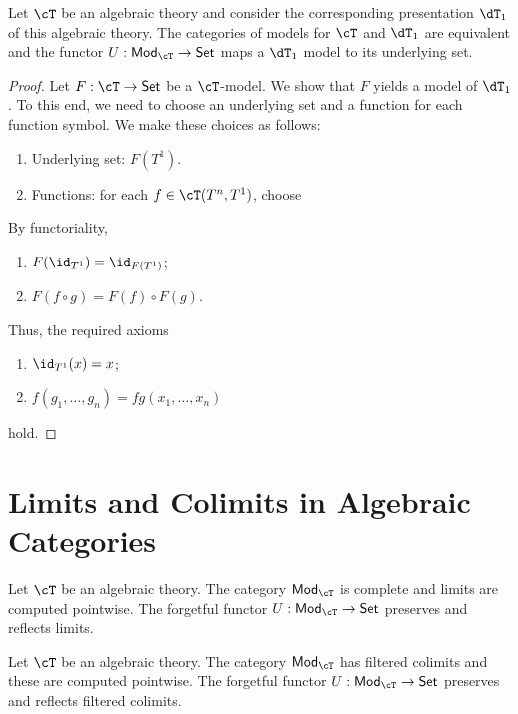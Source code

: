 \documentclass{amsart}
\begin{document}
\begin{lem}
  Let $\cT$ be an algebraic theory and consider the corresponding presentation $\dT_{1}$ of this algebraic theory.
  The categories of models for $\cT$ and $\dT_{1}$ are equivalent and the functor $U : \mathsf{Mod}_{\cT} \to \mathsf{Set}$ maps a $\dT_{1}$ model to its underlying set.
\end{lem}
\begin{proof}
  Let $F : \cT \to \mathsf{Set}$ be a $\cT$-model.
  We show that $F$ yields a model of $\dT_{1}$.
  To this end, we need to choose an underlying set and a function for each function symbol.
  We make these choices as follows:
  \begin{enumerate}
  \item Underlying set: $F(T^{1})$.
  \item Functions: for each $f \in \cT(T^{n},T^{1})$, choose
    
  \end{enumerate}
  By functoriality,
  \begin{enumerate}
  \item $F(\id_{T^{1}}) = \id_{F(T^{1})}$;
  \item $F(f \circ g) = F(f) \circ F(g)$.
  \end{enumerate}
  Thus, the required axioms
  \begin{enumerate}
  \item $\id_{T^{1}}(x) = x$;
  \item $f(g_{1},\ldots,g_{n}) = fg(x_{1},\ldots,x_{n})$
  \end{enumerate}
  hold.
\end{proof}

\section{Limits and Colimits in Algebraic Categories}
\label{sec:limits-and-colimits-in-algebraic-categories}

\begin{lem}
  Let $\cT$ be an algebraic theory.
  The category $\mathsf{Mod}_{\cT}$ is complete and limits are computed pointwise.
  The forgetful functor $U : \mathsf{Mod}_{\cT} \to \mathsf{Set}$ preserves and reflects limits.
\end{lem}

\begin{lem}
  Let $\cT$ be an algebraic theory.
  The category $\mathsf{Mod}_{\cT}$ has filtered colimits and these are computed pointwise.
  The forgetful functor $U : \mathsf{Mod}_{\cT} \to \mathsf{Set}$ preserves and reflects filtered colimits.
\end{lem}
\end{document}
